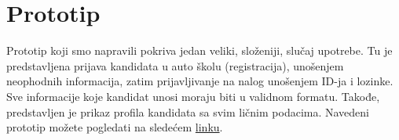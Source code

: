 \section{Prototip}
\label{sec:prototip}
Prototip koji smo napravili pokriva jedan veliki, složeniji, slučaj upotrebe.
Tu je pre\-dstavljena prijava kandidata u auto školu (registracija), unošenjem neophodnih informacija, zatim prijavljivanje na nalog
unošenjem ID-ja i lozinke. Sve informacije koje kandidat unosi moraju biti u validnom formatu. Takođe, predstavljen je prikaz profila kandidata sa svim ličnim podacima.  
Navedeni prototip možete pogledati na sledećem \href{https://github.com/tamarastojkovic/DRIVE-TO-SUCCEED/blob/main/Demo.rar}{linku}.


